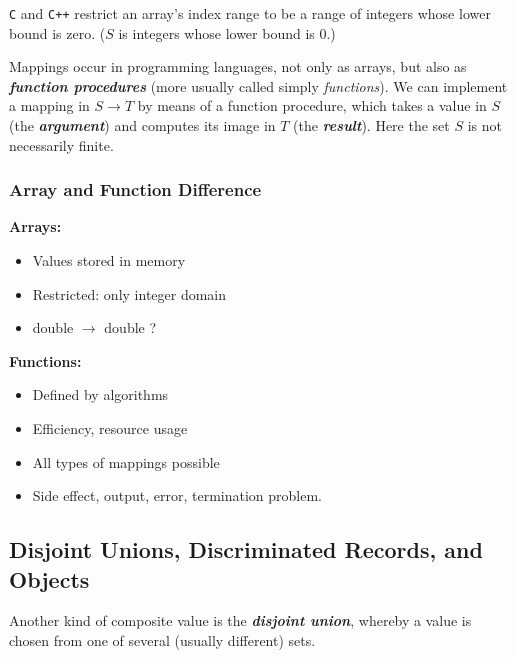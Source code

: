 \documentclass{article}
\begin{document}
\texttt{C} and \texttt{C++} restrict an array’s index range to be a range of integers whose lower bound is zero. ($S$ is integers whose lower bound is 0.)

Mappings occur in programming languages, not only as arrays, but also as \textbf{\textit{function procedures}} (more usually called simply \textit{functions}). We can implement a mapping in $S \rightarrow T$ by means of a function procedure, which takes a value in $S$ (the \textbf{\textit{argument}}) and computes its image in $T$ (the \textbf{\textit{result}}). Here the set $S$ is not necessarily finite.

\subsubsection{Array and Function Difference}

\begin{multicols}{2}
\textbf{Arrays:}
\begin{itemize}
    \item Values stored in memory
    \item Restricted: only integer domain
    \item double $\rightarrow$ double ?
\end{itemize}

\vfill\null
\columnbreak

\textbf{Functions:}
\begin{itemize}
    \item Defined by algorithms
    \item Efficiency, resource usage
    \item All types of mappings possible
    \item Side effect, output, error, termination problem.
\end{itemize}
\end{multicols}

\subsection{Disjoint Unions, Discriminated Records, and Objects}

Another kind of composite value is the \textbf{\textit{disjoint union}}, whereby a value is chosen from one of several (usually different) sets.
\end{document}
